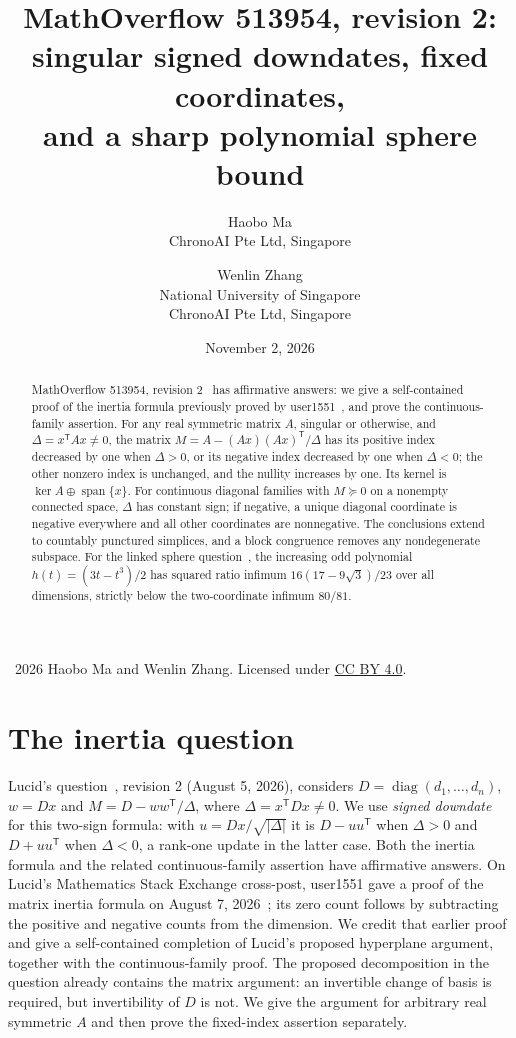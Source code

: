 \documentclass[11pt]{article}
\title{MathOverflow 513954, revision 2:\\
singular signed downdates, fixed coordinates,\\
and a sharp polynomial sphere bound}
\author{Haobo Ma\\\small ChronoAI Pte Ltd, Singapore
\and Wenlin Zhang\\\small National University of Singapore\\
\small ChronoAI Pte Ltd, Singapore}
\date{November 2, 2026}
\newcommand{\Span}{\operatorname{span}}
\newcommand{\diag}{\operatorname{diag}}
\begin{document}
\maketitle
\begin{abstract}
MathOverflow 513954, revision 2~\cite{lucid} has affirmative answers:
we give a self-contained proof of the inertia formula previously proved
by user1551~\cite{user1551}, and prove the continuous-family assertion.
For any real symmetric matrix $A$, singular or otherwise, and
$\Delta=x^{\mathsf T}Ax\ne0$, the matrix
$M=A-(Ax)(Ax)^{\mathsf T}/\Delta$ has its positive index decreased by one
when $\Delta>0$, or its negative index decreased by one when $\Delta<0$;
the other nonzero index is unchanged, and the nullity increases by one.
Its kernel is $\ker A\oplus\Span\{x\}$.
For continuous diagonal families with $M\succeq0$ on a nonempty connected
space, $\Delta$ has constant sign; if negative, a unique diagonal coordinate
is negative everywhere and all other coordinates are nonnegative.
The conclusions extend to countably punctured simplices, and a block
congruence removes any nondegenerate subspace. For the linked sphere
question~\cite{otherquestion}, the increasing odd polynomial
$h(t)=(3t-t^3)/2$ has squared ratio infimum
$16(17-9\sqrt3)/23$ over all dimensions, strictly below the
two-coordinate infimum $80/81$.
\end{abstract}
\noindent\small\textcopyright\ 2026 Haobo Ma and Wenlin Zhang.
Licensed under \href{https://creativecommons.org/licenses/by/4.0/}{CC BY 4.0}.
\normalsize

\section{The inertia question}
Lucid's question~\cite{lucid}, revision 2 (August 5, 2026), considers
$D=\diag(d_1,\ldots,d_n)$, $w=Dx$ and $M=D-ww^{\mathsf T}/\Delta$,
where $\Delta=x^{\mathsf T}Dx\ne0$.
We use \emph{signed downdate} for this two-sign formula: with
$u=Dx/\sqrt{|\Delta|}$ it is $D-uu^{\mathsf T}$ when $\Delta>0$ and
$D+uu^{\mathsf T}$ when $\Delta<0$, a rank-one update in the latter case.
Both the inertia formula and the related continuous-family assertion have
affirmative answers. On Lucid's Mathematics Stack Exchange cross-post,
user1551 gave a proof of the matrix inertia formula on August 7,
2026~\cite{user1551}; its zero count follows by subtracting the positive
and negative counts from the dimension. We credit that earlier proof and
give a self-contained completion of Lucid's proposed hyperplane argument,
together with the continuous-family proof.
The proposed decomposition in the question already
contains the matrix argument: an invertible change of basis is required,
but invertibility of $D$ is not. We give the argument for arbitrary real
symmetric $A$ and then prove the fixed-index assertion separately.
\end{document}
